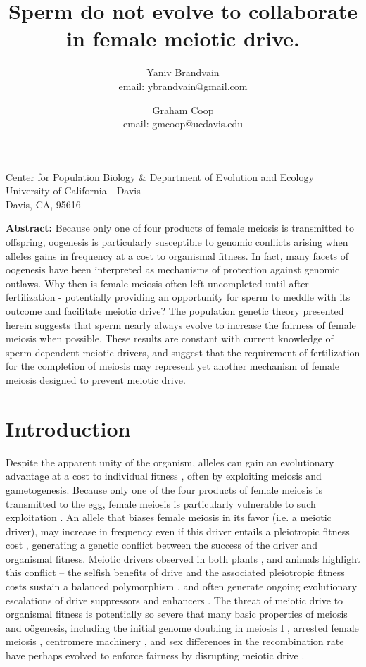 \documentclass[12pt,letterpaper]{article}
\title{
Sperm do not evolve to collaborate in female meiotic drive. 
}
\author{Yaniv Brandvain \\ email: ybrandvain@gmail.com  \and Graham Coop \\ email: gmcoop@ucdavis.edu }
\date{}
\begin{document}
\maketitle
\begin{center}
Center for Population Biology \& Department of Evolution and Ecology \\ University of California - Davis \\ Davis, CA, 95616
\end{center}

{\bf Abstract:}
Because only one of four products of female meiosis is transmitted to offspring, oogenesis is particularly
	 susceptible to genomic conflicts arising when alleles gains in frequency at a cost to organismal fitness. 
In fact, many facets of oogenesis have been interpreted as mechanisms of protection against genomic outlaws. 
Why then is female meiosis often left uncompleted until after fertilization - 
	potentially providing an opportunity for sperm to meddle with its outcome and facilitate meiotic drive? 
The population genetic theory presented herein suggests that
	sperm nearly always evolve to increase the fairness of female meiosis when possible. 
These results are constant with current knowledge of sperm-dependent meiotic drivers, 
	and suggest that the requirement of fertilization for the completion of meiosis may represent 
	yet another mechanism of female meiosis designed to prevent meiotic drive.
\newpage

\section*{Introduction}
Despite the apparent unity of the organism, alleles can
gain an evolutionary advantage at a cost to  individual fitness
\citep{Burt2006}, often by exploiting meiosis and gametogenesis.
Because only one of the four products of female meiosis is transmitted to the egg, female meiosis is particularly vulnerable to such exploitation \citep{Sandler1957,Pardo-ManuelDeVillena2001a}. 
An allele that biases female meiosis in its favor (i.e. a meiotic driver), may increase in frequency even if this driver entails a pleiotropic fitness cost \citep{Prout1973}, generating a genetic conflict between the success of the driver and organismal fitness.
Meiotic drivers observed in both plants
\citep{Buckler1999,Fishman2005,Fishman2008}, and animals
\citep{Agulnik1990,Wu2005,Pardo-ManuelDeVillena2001c} highlight this
conflict -- the selfish benefits of drive and the associated
pleiotropic fitness costs sustain a balanced polymorphism
\citep{Prout1973}, 
and often generate ongoing evolutionary escalations of drive suppressors and enhancers \citep{Dawe1996,Fishman2008}. 
The threat of meiotic drive to organismal fitness is potentially so
severe that many basic properties of
meiosis and o\"{o}genesis, including the initial genome doubling in
meiosis I \citep{Haig1991}, arrested female meiosis
\citep{Mira1998}, centromere machinery \citep{Malik2002a,Malik2009,Malik2009}, and sex differences in the recombination rate \citep{Haig2010,Brandvain2012} 
have perhaps evolved to enforce fairness by disrupting meiotic drive \citep{Rice2013}.
\end{document}
